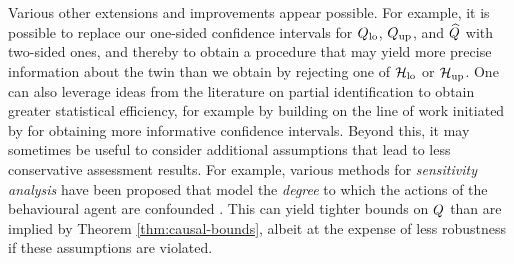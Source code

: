




Various other extensions and improvements appear possible.
For example, it is possible to replace our one-sided confidence intervals for $Q_{\mathrm{lo}}$, $Q_{\mathrm{up}}$, and $\widehat{Q}$ with two-sided ones, and thereby to obtain a procedure that may yield more precise information about the twin than we obtain by rejecting one of $\mathcal{H}_{\mathrm{lo}}$ or $\mathcal{H}_{\mathrm{up}}$.
One can also leverage ideas from the literature on partial identification \citep{manski2003partial} to obtain greater statistical efficiency, for example by building on the line of work initiated by \cite{imbens2004confidence} for obtaining more informative confidence intervals.
Beyond this, it may sometimes be useful to consider additional assumptions that lead to less conservative assessment results.
For example, various methods for \emph{sensitivity analysis} have been proposed that model the \emph{degree} to which the actions of the behavioural agent are confounded \citep{rosenbaum2002observational,tan2006distributional,yadlowsky2022bounds}.
This can yield tighter bounds on $Q$ than are implied by Theorem \ref{thm:causal-bounds}, albeit at the expense of less robustness if these assumptions are violated.


